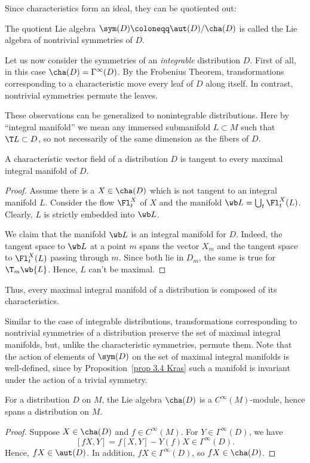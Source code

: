 Since characteristics form an ideal, they can be quotiented out:

\begin{defn}
    The quotient Lie algebra $\sym(D)\coloneqq \aut(D)\slash\cha(D)$ is called the Lie algebra of nontrivial symmetries of $D$.
\end{defn}

Let us now consider the symmetries of an \emph{integrable} distribution $D$. First of all, in this case $\cha(D)=\Gamma^\infty(D)$. By the Frobenius Theorem, transformations corresponding to a characteristic move every leaf of $D$ along itself. In contrast, nontrivial symmetries permute the leaves. 

These observations can be generalized to nonintegrable distributions. Here by ``integral manifold'' we mean any immersed submanifold $L\subset M$ such that $\T L\subset D$, so not necessarily of the same dimension as the fibers of $D$.

\begin{prop}\label{prop 3.4 Kras}
    A characteristic vector field of a distribution $D$ is tangent to every maximal integral manifold of $D$.
\end{prop}
\begin{proof}
    Assume there is a $X\in\cha(D)$ which is not tangent to an integral manifold $L$. Consider the flow $\Fl^X_t$ of $X$ and the manifold $\wb L=\bigcup_t \Fl^X_t(L)$. Clearly, $L$ is strictly embedded into $\wb L$.

    We claim that the manifold $\wb L$ is an integral manifold for $D$. Indeed, the tangent space to $\wb L$ at a point $m$ spans the vector $X_m$ and the tangent space to $\Fl^X_t(L)$ passing through $m$. Since both lie in $D_m$, the same is true for $\T_m \wb{L}$. Hence, $L$ can't be maximal.
\end{proof}

Thus, every maximal integral manifold of a distribution is composed of its characteristics.

Similar to the case of integrable distributions, transformations corresponding to nontrivial symmetries of a distribution preserve the set of maximal integral manifolds, but, unlike the characteristic symmetries, permute them. Note that the action of elements of $\sym(D)$ on the set of maximal integral manifolds is well-defined, since by Proposition~\ref{prop 3.4 Kras} such a manifold is invariant under the action of a trivial symmetry.

\begin{prop}\label{prop 3.5 Kras}
    For a distribution $D$ on $M$, the Lie algebra $\cha(D)$ is a $C^\infty(M)$-module, hence spans a distribution on $M$.
\end{prop}
\begin{proof}
    Suppose $X\in\cha(D)$ and $f\in C^\infty(M)$. For $Y\in \Gamma^\infty(D)$, we have 
    \[[fX,Y]=f[X,Y]-Y(f)X\in \Gamma^\infty(D).\]
    Hence, $fX\in \aut(D)$. In addition, $fX\in\Gamma^\infty(D)$, so $fX\in\cha(D)$.
\end{proof}

